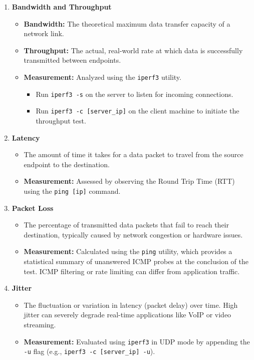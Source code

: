 \documentclass[journal]{IEEEtran}
\begin{document}
\begin{enumerate}
    \item \textbf{Bandwidth and Throughput}
    \begin{itemize}
        \item \textbf{Bandwidth:} The theoretical maximum data transfer capacity of a network link.
        \item \textbf{Throughput:} The actual, real-world rate at which data is successfully transmitted between endpoints.
        \item \textbf{Measurement:} Analyzed using the \texttt{iperf3} utility.
        \begin{itemize}
            \item Run \texttt{iperf3 -s} on the server to listen for incoming connections.
            \item Run \texttt{iperf3 -c [server\_ip]} on the client machine to initiate the throughput test.
        \end{itemize}
    \end{itemize}

    \item \textbf{Latency}
    \begin{itemize}
        \item The amount of time it takes for a data packet to travel from the source endpoint to the destination.
        \item \textbf{Measurement:} Assessed by observing the Round Trip Time (RTT) using the \texttt{ping [ip]} command.
    \end{itemize}

    \item \textbf{Packet Loss}
    \begin{itemize}
        \item The percentage of transmitted data packets that fail to reach their destination, typically caused by network congestion or hardware issues.
        \item \textbf{Measurement:} Calculated using the \texttt{ping} utility, which provides a statistical summary of unanswered ICMP probes at the conclusion of the test. ICMP filtering or rate limiting can differ from application traffic.
    \end{itemize}

    \item \textbf{Jitter}
    \begin{itemize}
        \item The fluctuation or variation in latency (packet delay) over time. High jitter can severely degrade real-time applications like VoIP or video streaming.
        \item \textbf{Measurement:} Evaluated using \texttt{iperf3} in UDP mode by appending the \texttt{-u} flag (e.g., \texttt{iperf3 -c [server\_ip] -u}).
    \end{itemize}
\end{enumerate}
\end{document}
